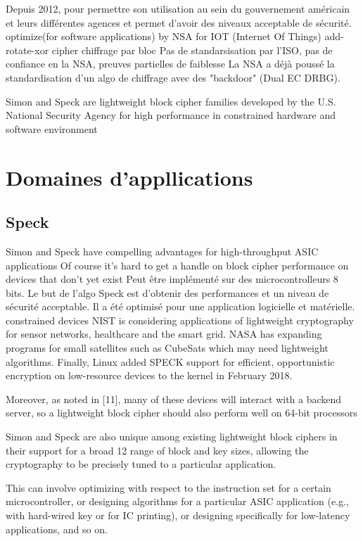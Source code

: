 \documentclass{article}
\begin{document}
Depuis 2012, pour permettre son utilisation au sein du gouvernement américain et leurs différentes agences et permet d'avoir des niveaux acceptable de sécurité.
optimize(for software applications) by NSA for IOT (Internet Of Things)
add-rotate-xor cipher
chiffrage par bloc
Pas de standarsisation par l'ISO, pas de confiance en la NSA, preuves partielles de faiblesse
La NSA a déjà poussé la standardisation d'un algo de chiffrage avec des "backdoor" (Dual EC DRBG).

Simon and Speck are lightweight block cipher families developed by the U.S. National Security Agency for high performance in constrained hardware and software environment

\section{Domaines d'appllications}

\subsection{Speck}
Simon and Speck have compelling advantages for high-throughput ASIC applications
Of course it’s hard to get a handle on block cipher performance on devices that don’t yet exist
Peut être implémenté sur des microcontrolleurs 8 bits.
Le but de l'algo Speck est d'obtenir des performances et un niveau de sécurité acceptable.
Il a été optimisé pour une application logicielle et matérielle.
constrained devices
NIST is considering applications of lightweight cryptography for sensor networks, healthcare and the smart grid.
NASA has expanding programs for small satellites such as CubeSats which may need lightweight algorithms. Finally, Linux added SPECK support for efficient, opportunistic encryption on low-resource devices to the kernel in February 2018.

Moreover, as noted in [11], many of these devices will interact with a backend server, so a lightweight block cipher should also perform well on 64-bit processors

Simon and Speck are also unique among existing lightweight block ciphers in their support for a broad 12 range of block and key sizes, allowing the cryptography to be precisely tuned to a particular application.

This can involve optimizing with respect to the instruction set for a certain microcontroller, or designing algorithms for a particular ASIC application (e.g., with hard-wired key or for IC printing), or designing specifically for low-latency applications, and so on.
\end{document}
